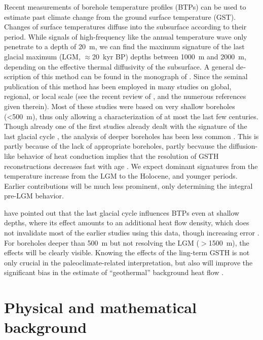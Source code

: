 \documentclass[cp]{copernicus}
\begin{document}
Recent measurements of borehole temperature profiles (BTPs) can be used to estimate past 
climate change from the ground surface temperature (GST). Changes of surface temperatures
diffuse into the sub­surface according to their period. While signals of high-frequency 
like the annual temperature wave only pene­trate to a depth of 20~m, we can find the maximum
signature of the last glacial maximum (LGM, $\approx$20~kyr BP) depths between 1000~m and 2000~m, 
depending on the effective thermal diffusivity of the subsurface. A general de­scription of this 
method can be found in the monograph of \citet{Bodri2007a}. Since the seminal publi­cation of 
\citet{Lachenbruch1986a} this method has been employed in many studies on global, regional, or local 
scale (see the recent review of \citet{Gonzalez-Rouco2009a}, and the numerous references given 
therein). Most of these studies were based on very shallow boreholes (<500~m), thus only allowing a 
characterization of at most the last 
few centuries. Though already one of the first studies already dealt with the signature of the last 
glacial cycle \citep{Hotchkiss1934a}, the analysis of deeper boreholes has been less common 
\citep{Demezhko2012a,Kukkonen2011a,Kukkonen2011c,Chouinard2009a,Majorowicz2008a,Rath2007a,
Mottaghy2006a,Clauser1995a}. This is partly because of the lack of appropriate boreholes, partly 
becvause the diffusion-like behavior of heat conduction implies that the resolution of GSTH 
reconstructions decreases fast with age \cite[e.g.][]{Demezhko2001a}. We expect dominant signatures 
from the temperature increase from the LGM to the Holocene, and younger periods. Earlier 
contributions will be much less prominent, only determining the integral pre-LGM behavior. 

\citet{Rath2012a} have pointed out that the last glacial cycle influences BTPs even at shallow 
depths, where its effect amounts to an additional heat flow density, which does not invalidate most 
of the earlier studies using this data, though increasing error \citep{Beltrami2011a, Rath2012a}. 
For boreholes deeper than 500~m but not resolving the LGM ($>$1500~m), the effects will be clearly 
visible. Knowing the effects of the ling-term GSTH is not only crucial in the paleoclimate-related 
interpretation, but also will improve the significant bias in the estimate of ``geothermal'' 
background heat­ flow \cite[e.g.][]{Westaway2013a,Majorowicz2011a,Slagstad2009a}. 


\section{Physical and mathematical background}
\end{document}
